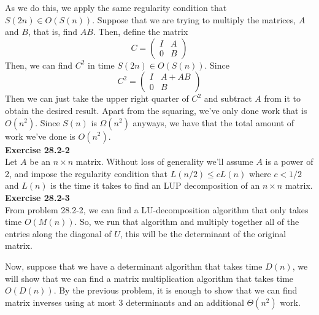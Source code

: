 \documentclass{article}
\begin{document}
As we do this, we apply the same regularity condition that $S(2n)\in O(S(n))$. Suppose that we are trying to multiply the matrices, $A$ and $B$, that is, find $AB$. Then, define the matrix 
\[
C = \left( \begin{array}{cc}I&A\\0&B\end{array}\right)
\]
Then, we can find $C^2$ in time $S(2n) \in O(S(n))$. Since 
\[
C^2 = \left( \begin{array}{cc}I&A+AB\\0&B\end{array}\right)
\]
Then we can just take the upper right quarter of $C^2$ and subtract $A$ from it to obtain the desired result. Apart from the squaring, we've only done work that is $O(n^2)$. Since $S(n)$ is $\Omega(n^2)$ anyways, we have that the total amount of work we've done is $O(n^2)$.\\

\noindent\textbf{Exercise 28.2-2}\\

Let $A$ be an $n \times n$ matrix.  Without loss of generality we'll assume $A$ is a power of 2, and impose the regularity condition that $L(n/2) \leq c L(n)$ where $c < 1/2$ and $L(n)$ is the time it takes to find an LUP decomposition of an $n \times n$ matrix.  \\


\noindent\textbf{Exercise 28.2-3}\\

From problem 28.2-2, we can find a LU-decomposition algorithm that only takes time $O(M(n))$. So, we run that algorithm and multiply together all of the entries along the diagonal of $U$, this will be the determinant of the original matrix.

Now, suppose that we have a determinant algorithm that takes time $D(n)$, we will show that we can find a matrix multiplication algorithm that takes time $O(D(n))$.  By the previous problem, it is enough to show that we can find matrix inverses using at most 3 determinants and an additional $\Theta(n^2)$ work. 
\end{document}
